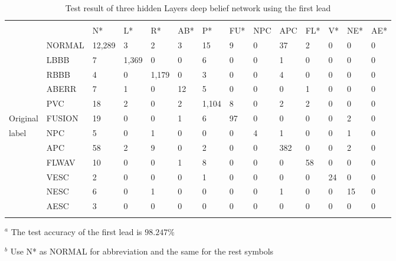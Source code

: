 \documentclass[graybox]{svmult}
\begin{document}
\begin{table}
\caption{Test result of three hidden Layers deep belief network using the first lead}
\label{tab:7}  
\begin{tabular}{p{1cm}p{1.2cm}p{0.9cm}p{0.7cm}p{0.7cm}p{0.6cm}p{0.6cm}p{0.6cm}p{0.7cm}p{0.6cm}p{0.6cm}p{0.6cm}p{0.7cm}p{0.7cm}}
\hline\noalign{\smallskip}
\multicolumn{9}{r}{Algorithm classified label} \\
\noalign{\smallskip}\hline\noalign{\smallskip}
		 &      & N* & L* & R* & AB* & P* & FU* & NPC & APC & FL* & V* & NE*& AE*\\
\noalign{\smallskip}\svhline\noalign{\smallskip}
 		 & NORMAL & 12,289& 3   &  2   &  3   &  15  &  9    &	0   &  37 &   2   &   0  &  0  &  0 \\
	     & LBBB   &  7    & 1,369&  0  &  0   &  6   &  0    &  0   &  1  &   0   &   0  &  0  &  0 \\
		 & RBBB   &  4    &  0  & 1,179&  0   &  3   &  0    &	0   &  4  &   0   &   0  &  0  &  0 \\
		 & ABERR  &  7    &  1  &  0   &  12  &  5   &  0    &	0   &  0  &   1   &   0  &  0  &  0 \\
		 & PVC    &  18   &  2  &  0   &  2   & 1,104&  8    &	0   &  2  &   2   &   0  &  0  &  0 \\
Original & FUSION &	 19   &  0  &  0   &  1   &  6   &   97  &	0   &  0  &   0   &   0  &  2  &  0 \\
label    & NPC    &	 5    &  0  &  1   &  0   &  0   &  0    &	4   &  1  &   0   &   0  &  1  &  0 \\
		 & APC    &	 58   &  2  &  9   &  0   &  2   &  0    &	0   &  382&   0   &   0  &  2  &  0 \\
		 & FLWAV  &	 10   &  0  &  0   &  1   &  8   &  0    &	0   &  0  &   58  &   0  &  0  &  0 \\
		 & VESC   &	 2    &  0  &  0   &  0   &  1   &  0    &	0   &  0  &   0   &  24  &  0  &  0 \\
		 & NESC   &	 6    &  0  &  1   &  0   &  0   &  0    &	0   &  1  &   0   &   0  &  15 &  0 \\
		 & AESC   &	 3    &  0  &  0   &  0   &  0   &  0    &	0   &  0  &   0   &   0  &  0  &  0 \\

\noalign{\smallskip}\hline\noalign{\smallskip}
\end{tabular}
$^a$ The test accuracy of the first lead is $98.247\%$

$^b$ Use N* as NORMAL for abbreviation and the same for the rest symbols
\end{table}
\end{document}

